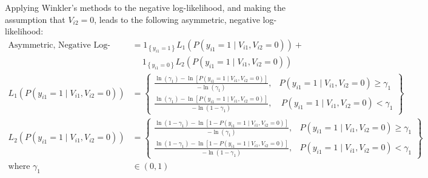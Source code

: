 Applying Winkler's methods to the negative log-likelihood, and making the assumption that $V_{i2} = 0$, leads to the following asymmetric, negative log-likelihood:
\begin{equation}
\label{eq:asym_log_loss}
\begin{aligned}
\textrm{Asymmetric, Negative Log-Likelihood} &= 1_{\left\lbrace y_{i1} = 1 \right\rbrace} L_1 \left( P \left( y_{i1} = 1 \mid V_{i1}, V_{i2} = 0 \right) \right) +\\
&\quad \  1_{\left\lbrace y_{i1} = 0 \right\rbrace} L_2 \left( P \left( y_{i1} = 1 \mid V_{i1}, V_{i2} = 0 \right) \right)
\\
L_1 \left( P \left( y_{i1} = 1 \mid V_{i1}, V_{i2} = 0 \right) \right) &= \left\lbrace \begin{array}{cc}
\frac{\ln \left( \gamma_1 \right) - \ln \left[ P \left( y_{i1} = 1 \mid V_{i1}, V_{i2} = 0 \right) \right]}{- \ln \left( \gamma_1 \right)}, & P \left( y_{i1} = 1 \mid V_{i1}, V_{i2} = 0 \right) \geq \gamma_1 
\\[1.4ex]
\frac{\ln \left( \gamma_1 \right) - \ln \left[ P \left( y_{i1} = 1 \mid V_{i1}, V_{i2} = 0 \right) \right]}{- \ln \left( 1 - \gamma_1 \right)}, &\  P \left( y_{i1} = 1 \mid V_{i1}, V_{i2} = 0 \right) < \gamma_1
\end{array} \right\rbrace
\\[1.4ex]
L_2 \left( P \left( y_{i1} = 1 \mid V_{i1}, V_{i2} = 0 \right) \right) &= \left\lbrace \begin{array}{cc}
\frac{\ln \left( 1 - \gamma_1 \right) - \ln \left[ 1 - P \left( y_{i1} = 1 \mid V_{i1}, V_{i2} = 0 \right) \right]}{- \ln \left( \gamma_1 \right)}, & P \left( y_{i1} = 1 \mid V_{i1}, V_{i2} = 0 \right) \geq \gamma_1 
\\[1.4ex]
\frac{\ln \left( 1 - \gamma_1 \right) - \ln \left[ 1 - P \left( y_{i1} = 1 \mid V_{i1}, V_{i2} = 0 \right) \right]}{- \ln \left( 1 - \gamma_1 \right)}, & P \left( y_{i1} = 1 \mid V_{i1}, V_{i2} = 0 \right) < \gamma_1
\end{array} \right\rbrace \\
\textrm{where } \gamma_1 &\in \left( 0, 1 \right)
\end{aligned}
\end{equation}


